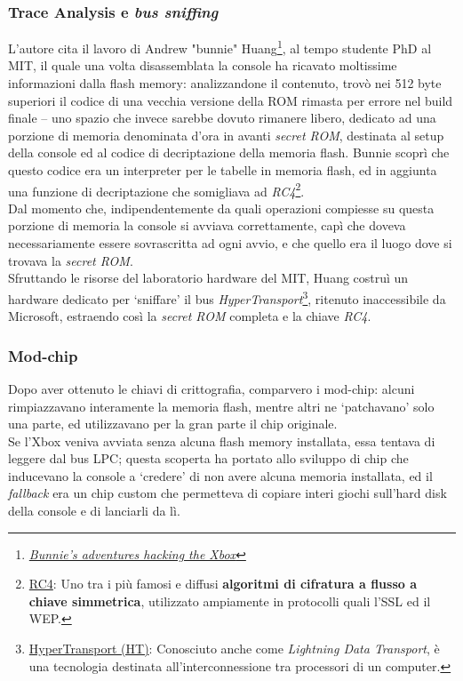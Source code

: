 \subsubsection{Trace Analysis e \textit{bus sniffing}}
L'autore cita il lavoro di Andrew "bunnie" Huang\footnote{\href{https://www.bunniestudios.com/bunnie/proj/anatak/xboxmod.html}{\textit{Bunnie's adventures hacking the Xbox}}}, al tempo studente PhD al MIT, il quale una volta disassemblata la console ha ricavato moltissime informazioni dalla flash memory:
analizzandone il contenuto, trovò nei 512 byte superiori il codice di una vecchia versione della ROM rimasta per errore nel build finale -- uno spazio che invece sarebbe dovuto rimanere libero, dedicato ad una porzione di memoria denominata d'ora in avanti  \textit{secret ROM}, destinata al setup della console ed al codice di decriptazione della memoria flash. 
Bunnie scoprì che questo codice era un interpreter per le tabelle in memoria flash, ed in aggiunta una funzione di decriptazione che somigliava ad \textit{RC4}\footnote{\href{https://en.wikipedia.org/wiki/RC4}{RC4}: Uno tra i più famosi e diffusi \textbf{algoritmi di cifratura a flusso a chiave simmetrica}, utilizzato ampiamente in protocolli quali l'SSL ed il WEP.}.\\
Dal momento che, indipendentemente da quali operazioni compiesse su questa porzione di memoria la console si avviava correttamente, capì che doveva necessariamente essere sovrascritta ad ogni avvio, e che quello era il luogo dove si trovava la \textit{secret ROM}.\\
Sfruttando le risorse del laboratorio hardware del MIT, Huang costruì un hardware dedicato per `sniffare' il bus \textit{HyperTransport}\footnote{\href{https://en.wikipedia.org/wiki/HyperTransport}{HyperTransport (HT)}: Conosciuto anche come \textit{Lightning Data Transport}, è una tecnologia destinata all'interconnessione tra processori di un computer.}, 
ritenuto inaccessibile da Microsoft, estraendo così la \textit{secret ROM} completa e la chiave \textit{RC4}.
\subsubsection{Mod-chip}
Dopo aver ottenuto le chiavi di crittografia, comparvero i mod-chip: alcuni rimpiazzavano interamente la memoria flash, mentre altri ne `patchavano' solo una parte, ed utilizzavano per la gran parte il chip originale. \\
Se l'Xbox veniva avviata senza alcuna flash memory installata, essa tentava di leggere dal bus LPC; questa scoperta ha portato allo sviluppo di chip che inducevano la console a `credere' di non avere alcuna memoria installata, ed il \textit{fallback} era un chip custom che permetteva di copiare interi giochi sull'hard disk della console e di lanciarli da lì.

